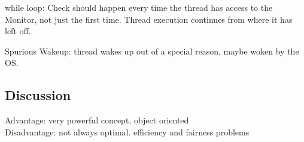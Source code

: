 while loop: Check should happen every time the thread has access to the Monitor, not just the first time. Thread execution continues from where it has left off.

Spurious Wakeup: thread wakes up out of a special reason, maybe woken by the OS.

\subsection{Discussion}

Advantage: very powerful concept, object oriented\\

\noindent
Disadvantage: not always optimal. efficiency and fairness problems